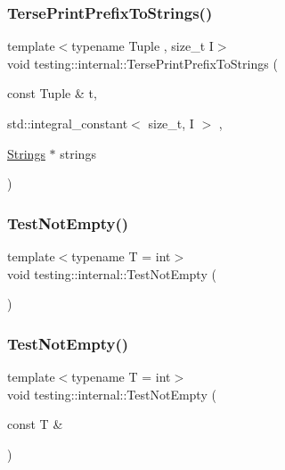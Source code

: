 \subsubsection{\texorpdfstring{Terse\+Print\+Prefix\+To\+Strings()}{TersePrintPrefixToStrings()}\hspace{0.1cm}{\footnotesize\ttfamily [2/2]}}
{\footnotesize\ttfamily template$<$typename Tuple , size\+\_\+t I$>$ \\
void testing\+::internal\+::\+Terse\+Print\+Prefix\+To\+Strings (\begin{DoxyParamCaption}\item[{const Tuple \&}]{t,  }\item[{std\+::integral\+\_\+constant$<$ size\+\_\+t, I $>$}]{,  }\item[{\hyperlink{namespacetesting_1_1internal_a50003bb76ec2934be1062be11efba8bf}{Strings} $\ast$}]{strings }\end{DoxyParamCaption})}

\mbox{\label{namespacetesting_1_1internal_aa07a04b597551a51d862911b22a94eb9}} 
\subsubsection{\texorpdfstring{Test\+Not\+Empty()}{TestNotEmpty()}\hspace{0.1cm}{\footnotesize\ttfamily [1/2]}}
{\footnotesize\ttfamily template$<$typename T  = int$>$ \\
void testing\+::internal\+::\+Test\+Not\+Empty (\begin{DoxyParamCaption}{ }\end{DoxyParamCaption})}

\mbox{\label{namespacetesting_1_1internal_ad2f14c6dc7d6c3d78884910943e11bc1}} 
\subsubsection{\texorpdfstring{Test\+Not\+Empty()}{TestNotEmpty()}\hspace{0.1cm}{\footnotesize\ttfamily [2/2]}}
{\footnotesize\ttfamily template$<$typename T  = int$>$ \\
void testing\+::internal\+::\+Test\+Not\+Empty (\begin{DoxyParamCaption}\item[{const T \&}]{ }\end{DoxyParamCaption})}

